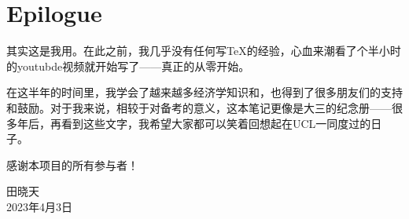\chapter*{Epilogue}

\fancyhead[R]{}
\fancyfoot[R]{}

其实这是我用。在此之前，我几乎没有任何写TeX的经验，心血来潮看了个半小时的youtubde视频就开始写了——真正的从零开始。

在这半年的时间里，我学会了越来越多经济学知识和，也得到了很多朋友们的支持和鼓励。对于我来说，相较于对备考的意义，这本笔记更像是大三的纪念册——很多年后，再看到这些文字，我希望大家都可以笑着回想起在UCL一同度过的日子。

感谢本项目的所有参与者！

\bigskip

\begin{flushright}
田晓天\\
2023年4月3日
\end{flushright}